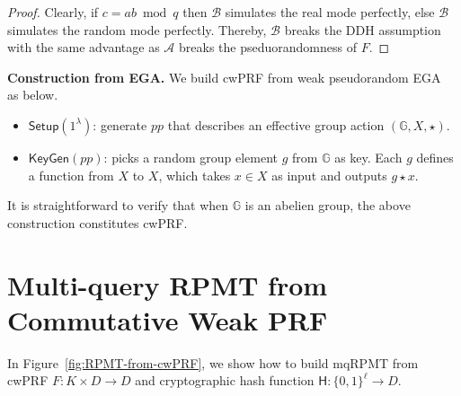 \documentclass[a4paper,10pt]{article}
\begin{document}
\begin{trivlist}
\begin{proof}
Clearly, if $c = ab \bmod q$ then $\mathcal{B}$ simulates the real mode perfectly, 
else $\mathcal{B}$ simulates the random mode perfectly. 
Thereby, $\mathcal{B}$ breaks the DDH assumption with the same advantage as 
$\mathcal{A}$ breaks the pseduorandomness of $F$. 
\end{proof}

\item \textbf{Construction from EGA.} We build cwPRF from weak pseudorandom EGA~\cite{AFMP-ASIACRYPT-2020} as below. 
\begin{itemize}
\item $\mathsf{Setup}(1^\lambda)$: generate $pp$ that describes an effective group action $(\mathbb{G}, X, \star)$. 
\item $\mathsf{KeyGen}(pp)$: picks a random group element $g$ from $\mathbb{G}$ as key. 
    Each $g$ defines a function from $X$ to $X$, which takes $x \in X$ as input and outputs $g \star x$.  
\end{itemize}
It is straightforward to verify that when $\mathbb{G}$ is an abelien group, 
the above construction constitutes cwPRF. 
\end{trivlist}

\section{Multi-query RPMT from Commutative Weak PRF}
In Figure~\ref{fig:RPMT-from-cwPRF}, 
we show how to build mqRPMT from cwPRF $F: K \times D \rightarrow D$ 
and cryptographic hash function $\mathsf{H}: \{0,1\}^\ell \rightarrow D$. 
\end{document}

